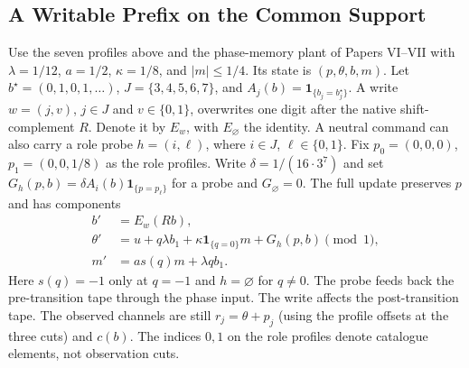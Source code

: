\documentclass[11pt,a4paper]{article}
\theoremstyle{definition}
\begin{document}
\subsection{A Writable Prefix on the Common Support}

Use the seven profiles above and the phase-memory plant of Papers VI--VII \cite{paper6,paper7} with $\lambda=1/12$, $a=1/2$, $\kappa=1/8$, and $|m|\le1/4$. Its state is $(p,\theta,b,m)$. Let $b^\star=(0,1,0,1,\ldots)$, $J=\{3,4,5,6,7\}$, and $A_j(b)=\mathbf 1_{\{b_j=b_j^\star\}}$. A write $w=(j,v)$, $j\in J$ and $v\in\{0,1\}$, overwrites one digit after the native shift-complement $R$. Denote it by $E_w$, with $E_\varnothing$ the identity. A neutral command can also carry a role probe $h=(i,\ell)$, where $i\in J$, $\ell\in\{0,1\}$. Fix $p_0=(0,0,0)$, $p_1=(0,0,1/8)$ as the role profiles. Write $\delta=1/(16\cdot 3^7)$ and set $G_h(p,b)=\delta A_i(b)\mathbf 1_{\{p=p_\ell\}}$ for a probe and $G_\varnothing=0$. The full update preserves $p$ and has components
\begin{align*}
 b'&=E_w(Rb),\\
 \theta'&=u+q\lambda b_1+\kappa\mathbf 1_{\{q=0\}}m+G_h(p,b)\pmod 1,\\
 m'&=a s(q)m+\lambda q b_1 .
\end{align*}
Here $s(q)=-1$ only at $q=-1$ and $h=\varnothing$ for $q\ne0$. The probe feeds back the pre-transition tape through the phase input. The write affects the post-transition tape. The observed channels are still $r_j=\theta+p_j$ (using the profile offsets at the three cuts) and $c(b)$. The indices $0,1$ on the role profiles denote catalogue elements, not observation cuts.
\end{document}

